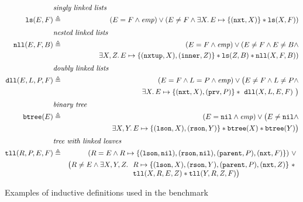 \documentclass[twoside,11pt]{article}
\newcommand{\sep}{.\,}
\newcommand{\posep}{*}
\newcommand{\points}{\mapsto}
\newcommand{\nil}{\mathtt{nil}}
\newcommand{\ls}{\mathtt{ls}}
\newcommand{\dll}{\mathtt{dll}}
\newcommand{\nll}{\mathtt{nll}}
\begin{document}
\begin{table}
\begin{eqnarray}
%
\lefteqn{\textit{singly linked lists}} \nonumber \\
\ls(E,F) & \triangleq & (E=F\land\mathit{emp}) \lor (E\neq F \land 
\exists X\sep E\points\{(\texttt{nxt},X)\}\posep \ls(X,F)) 
\\[1mm]
%  
\lefteqn{\textit{nested linked lists}} \nonumber \\ 
\nll(E,F,B) & \triangleq & (E=F\land\mathit{emp}) \lor (E\neq F \land E\neq B \land \\
&& \exists X,Z\sep E\points\{(\texttt{nxtup},X),(\texttt{inner},Z)\}\posep \ls(Z,B) \posep\nll(X,F,B)) \nonumber
\\[1mm]
%  
\lefteqn{\textit{doubly linked lists}} \nonumber \\ 
\dll(E, L, P, F) & \triangleq & (E=F\land L=P\land \mathit{emp}) \lor \big( E\neq F \land L\neq P \land \\
&& \exists X\sep E\points \{(\texttt{nxt},X),(\texttt{prv},P)\} \posep\ \dll(X,L,E,F)\ \big)\nonumber
\\[1mm]
%  
\lefteqn{\textit{binary tree}} \nonumber \\ 
\mathtt{btree}(E) & \triangleq & (E=\nil\land \mathit{emp}) \lor \big( E\neq \nil \land 
\\
&& \exists X,Y\sep E\points \{(\texttt{lson},X),(\texttt{rson},Y)\} \posep \mathtt{btree}(X) \posep \mathtt{btree}(Y)\big)
\nonumber 
\\[1mm]
%  
\lefteqn{\textit{tree with linked leaves}} \nonumber \\ 
\mathtt{tll}(R,P,E,F) & \triangleq & (R=E \land R\points \{(\texttt{lson},\nil),(\texttt{rson},\nil),(\texttt{parent},P),(\texttt{nxt},F)\}) ~\lor~ \\
&&\big( R\neq E \land \exists X,Y,Z\sep 
\begin{array}[t]{l}
R\points \{(\texttt{lson},X),(\texttt{rson},Y),(\texttt{parent},P),(\texttt{nxt},Z)\} \ \posep \\
\mathtt{tll}(X,R,E,Z) \posep \mathtt{tll}(Y,R,Z,F)\big)
\end{array} \nonumber  
\end{eqnarray}
\caption{Examples of inductive definitions used in the benchmark}
\label{tab:RD}
\vspace{-3eX}
\end{table}
\end{document}
